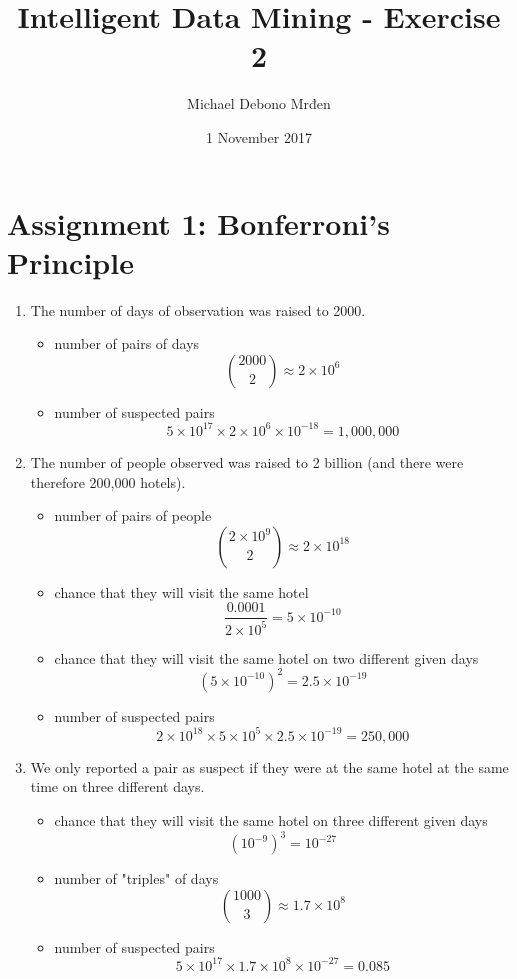 \documentclass{article}
\title{Intelligent Data Mining - Exercise 2}
\author{\fontencoding{T1}\selectfont Michael Debono Mrđen}
\date{1 November 2017}
\begin{document}
\maketitle

\section{Assignment 1: Bonferroni's Principle}
\renewcommand{\labelenumi}{\alph{enumi}.}
\renewcommand{\labelenumii}{(\alph{enumii})}
\begin{enumerate}
\item{The number of days of observation was raised to 2000.
\begin{itemize}
\item{number of pairs of days
\[ \binom{2000}{2} \approx 2 \times 10^6 \]}
\item{number of suspected pairs
\[ 5 \times 10^{17} \times 2 \times 10^6 \times 10^{-18} = 1,000,000 \]}
\end{itemize}
}

\item{The number of people observed was raised to 2 billion (and there were therefore 200,000 hotels).
\begin{itemize}
\item{number of pairs of people
\[ \binom{2 \times 10^9}{2} \approx 2 \times 10^{18} \]}
\item{chance that they will visit the same hotel
\[ \frac{0.0001}{2 \times 10^5} = 5 \times 10^{-10} \]}
\item{chance that they will visit the same hotel on two different given days
\[ (5 \times 10^{-10})^2 = 2.5 \times 10^{-19} \]}
\item{number of suspected pairs
\[ 2 \times 10^{18} \times 5 \times 10^5 \times 2.5 \times 10^{-19} = 250,000 \]}
\end{itemize}
}

\item{We only reported a pair as suspect if they were at the same hotel at the same time on three different days.
\begin{itemize}
\item{chance that they will visit the same hotel on three different given days
\[ (10^{-9})^3 = 10^{-27} \]}
\item{number of "triples" of days
\[ \binom{1000}{3} \approx 1.7 \times 10^8 \]}
\item{number of suspected pairs
\[ 5 \times 10^{17} \times 1.7 \times 10^8 \times 10^{-27} = 0.085 \]}
\end{itemize}
}
\end{enumerate}
\end{document}
